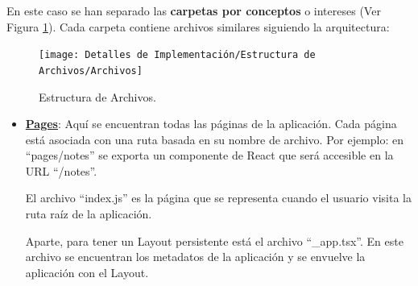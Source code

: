 \documentclass[12pt,twoside,titlepage]{report}
\begin{document}
En este caso se han separado las \textbf{carpetas por conceptos} o intereses (Ver Figura \ref{fig:Archivos}). Cada carpeta contiene archivos similares siguiendo la arquitectura:

\begin{figure}[H]
    \centering
    \texttt{[image: Detalles de Implementación/Estructura de Archivos/Archivos]}
    \caption{Estructura de Archivos.}
    \label{fig:Archivos}
\end{figure}

\begin{itemize}
    \item \href{https://github.com/alberttogoca/EarFit/tree/main/src/pages}{\textbf{Pages}}: Aquí se encuentran todas las páginas de la aplicación. Cada página está asociada con una ruta basada en su nombre de archivo. Por ejemplo: en ``pages/notes'' se exporta un componente de React que será accesible en la URL ``/notes''.
    
    El archivo ``index.js'' es la página que se representa cuando el usuario visita la ruta raíz de la aplicación.

    Aparte, para tener un Layout persistente está el archivo ``\_app.tsx''. En este archivo se encuentran los metadatos de la aplicación y se envuelve la aplicación con el Layout. 
    

\end{itemize}
\end{document}
